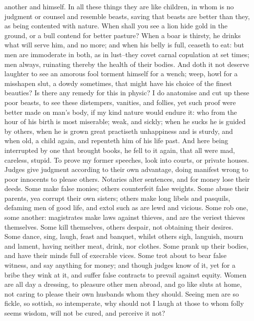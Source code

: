 another and himself. In all these things they are like
children, in whom is no judgment or counsel and resemble beasts, saving that
beasts are better than they, as being contented with nature.
When shall you see a lion hide gold in the ground, or a
bull contend for better pasture? When a boar is thirsty, he drinks what will
serve him, and no more; and when his belly is full, ceaseth to eat: but men are
immoderate in both, as in lust--they covet carnal copulation at set times; men
always, ruinating thereby the health of their bodies. And doth it not deserve
laughter to see an amorous fool torment himself for a wench; weep, howl for a
misshapen slut, a dowdy sometimes, that might have his choice of the finest
beauties? Is there any remedy for this in physic? I do anatomise and cut up
these poor beasts, to see these distempers, vanities, and
follies, yet such proof were better made on man's body, if my kind nature would
endure it: who from the hour of his birth is most
miserable; weak, and sickly; when he sucks he is guided by others, when he is
grown great practiseth unhappiness and is sturdy, and when
old, a child again, and repenteth him of his life past. And here being
interrupted by one that brought books, he fell to it again, that all were mad,
careless, stupid. To prove my former speeches, look into courts, or private
houses. Judges give judgment according to their own
advantage, doing manifest wrong to poor innocents to please others. Notaries
alter sentences, and for money lose their deeds. Some make false monies; others
counterfeit false weights. Some abuse their parents, yea corrupt their own
sisters; others make long libels and pasquils, defaming men of good life, and
extol such as are lewd and vicious. Some rob one, some another:
magistrates make laws against thieves, and are the veriest
thieves themselves. Some kill themselves, others despair, not obtaining their
desires. Some dance, sing, laugh, feast and banquet, whilst others sigh,
languish, mourn and lament, having neither meat, drink, nor clothes.
Some prank up their bodies, and have their minds full of
execrable vices. Some trot about to bear false witness, and
say anything for money; and though judges know of it, yet for a bribe they wink
at it, and suffer false contracts to prevail against equity. Women are all day
a dressing, to pleasure other men abroad, and go like sluts at home, not caring
to please their own husbands whom they should. Seeing men are so fickle, so
sottish, so intemperate, why should not I laugh at those to whom
folly seems wisdom, will not be cured, and perceive it not?

